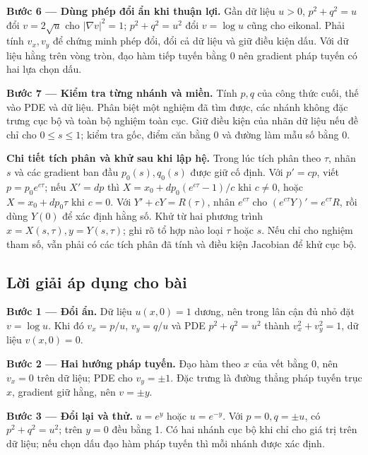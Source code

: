 \documentclass[10pt,a4paper]{article}
\begin{document}
\textbf{Bước 6 — Dùng phép đổi ẩn khi thuận lợi.} Gần dữ liệu $u>0$, $p^2+q^2=u$ đổi $v=2\sqrt u$ cho $|\nabla v|^2=1$; $p^2+q^2=u^2$ đổi $v=\log u$ cũng cho eikonal. Phải tính $v_x,v_y$ để chứng minh phép đổi, đổi cả dữ liệu và giữ điều kiện dấu. Với dữ liệu hằng trên vòng tròn, đạo hàm tiếp tuyến bằng 0 nên gradient pháp tuyến có hai lựa chọn dấu.

\textbf{Bước 7 — Kiểm tra từng nhánh và miền.} Tính $p,q$ của công thức cuối, thế vào PDE và dữ liệu. Phân biệt một nghiệm đã tìm được, các nhánh không đặc trưng cục bộ và toàn bộ nghiệm toàn cục. Giữ điều kiện của nhãn dữ liệu nếu đề chỉ cho $0\le s\le1$; kiểm tra gốc, điểm căn bằng 0 và đường làm mẫu số bằng 0.

\textbf{Chi tiết tích phân và khử sau khi lập hệ.} Trong lúc tích phân theo $\tau$, nhãn $s$ và các gradient ban đầu $p_0(s),q_0(s)$ được giữ cố định. Với $p'=cp$, viết $p=p_0e^{c\tau}$; nếu $X'=dp$ thì $X=x_0+dp_0(e^{c\tau}-1)/c$ khi $c\ne0$, hoặc $X=x_0+dp_0\tau$ khi $c=0$. Với $Y'+cY=R(\tau)$, nhân $e^{c\tau}$ cho $(e^{c\tau}Y)'=e^{c\tau}R$, rồi dùng $Y(0)$ để xác định hằng số. Khử từ hai phương trình $x=X(s,\tau),y=Y(s,\tau)$; ghi rõ tổ hợp nào loại $\tau$ hoặc $s$. Nếu chỉ cho nghiệm tham số, vẫn phải có các tích phân đã tính và điều kiện Jacobian để khử cục bộ.
\subsection*{Lời giải áp dụng cho bài}
\textbf{Bước 1 — Đổi ẩn.} Dữ liệu $u(x,0)=1$ dương, nên trong lân cận đủ nhỏ đặt $v=\log u$. Khi đó $v_x=p/u$, $v_y=q/u$ và PDE $p^2+q^2=u^2$ thành $v_x^2+v_y^2=1$, dữ liệu $v(x,0)=0$.

\textbf{Bước 2 — Hai hướng pháp tuyến.} Đạo hàm theo $x$ của vết bằng 0, nên $v_x=0$ trên dữ liệu; PDE cho $v_y=\pm1$. Đặc trưng là đường thẳng pháp tuyến trục $x$, gradient giữ hằng, nên $v=\pm y$.

\textbf{Bước 3 — Đổi lại và thử.} $u=e^y$ hoặc $u=e^{-y}$. Với $p=0,q=\pm u$, có $p^2+q^2=u^2$; trên $y=0$ đều bằng 1. Có hai nhánh cục bộ khi chỉ cho giá trị trên dữ liệu; nếu chọn dấu đạo hàm pháp tuyến thì mỗi nhánh được xác định.
\end{document}
